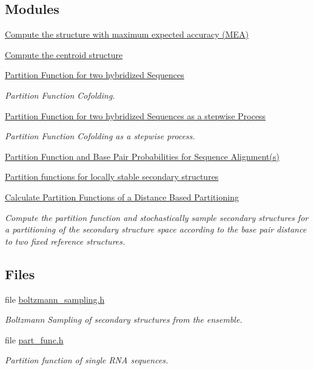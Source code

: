 \subsection*{Modules}
\begin{DoxyCompactItemize}
\item 
\hyperlink{group__mea__fold}{Compute the structure with maximum expected accuracy (\+M\+E\+A)}
\item 
\hyperlink{group__centroid__fold}{Compute the centroid structure}
\item 
\hyperlink{group__pf__cofold}{Partition Function for two hybridized Sequences}
\begin{DoxyCompactList}\small\item\em Partition Function Cofolding. \end{DoxyCompactList}\item 
\hyperlink{group__up__cofold}{Partition Function for two hybridized Sequences as a stepwise Process}
\begin{DoxyCompactList}\small\item\em Partition Function Cofolding as a stepwise process. \end{DoxyCompactList}\item 
\hyperlink{group__consensus__pf__fold}{Partition Function and Base Pair Probabilities for Sequence Alignment(s)}
\item 
\hyperlink{group__local__pf__fold}{Partition functions for locally stable secondary structures}
\item 
\hyperlink{group__kl__neighborhood__pf}{Calculate Partition Functions of a Distance Based Partitioning}
\begin{DoxyCompactList}\small\item\em Compute the partition function and stochastically sample secondary structures for a partitioning of the secondary structure space according to the base pair distance to two fixed reference structures. \end{DoxyCompactList}\end{DoxyCompactItemize}
\subsection*{Files}
\begin{DoxyCompactItemize}
\item 
file \hyperlink{boltzmann__sampling_8h}{boltzmann\+\_\+sampling.\+h}
\begin{DoxyCompactList}\small\item\em Boltzmann Sampling of secondary structures from the ensemble. \end{DoxyCompactList}\item 
file \hyperlink{part__func_8h}{part\+\_\+func.\+h}
\begin{DoxyCompactList}\small\item\em Partition function of single R\+N\+A sequences. \end{DoxyCompactList}\end{DoxyCompactItemize}
